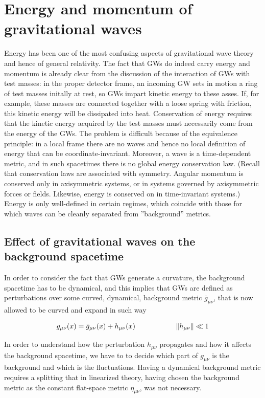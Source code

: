 \documentclass[binding=0.6cm, LaM]{sapthesis}
\begin{document}
\section{Energy and momentum of gravitational waves}
	Energy has been one of the most confusing aspects of gravitational wave theory and hence of general relativity.
	The fact that GWs do indeed carry energy and momentum is already clear from the discussion of the interaction of GWs with test masses:
	in the proper detector frame, an incoming GW sets in motion a ring of test masses initally at rest, 
	so GWs impart kinetic energy to these asses.
	If, for example, these masses are connected together with a loose spring with friction, 
	this kinetic energy will be dissipated into heat.
	Conservation of energy requires that the kinetic energy acquired by the test masses must necessarily come from the energy of the GWs.
	The problem is difficult because of the equivalence principle: in a local frame there are no waves and hence no local definition 
	of energy that can be coordinate-invariant.
	Moreover, a wave is a time-dependent metric, and in such spacetimes there is no global energy conservation law. 
	(Recall that conservation laws are associated with symmetry.
	Angular momentum is conserved only in axisymmetric systems, or in systems governed by axisymmetric forces or fields.
	Likewise, energy is conserved on in time-invariant systems.) 
	Energy is only well-defined in certain regimes, which coincide with those for which waves can be cleanly separated from ”background”
 	metrics.


\subsection{Effect of gravitational waves on the background spacetime}

	In order to consider the fact that GWs generate a curvature, the background spacetime has to be dynamical, 
	and this implies that GWs are defined as perturbations over some curved, dynamical, 
	background metric $\bar g_{\mu \nu}$, that is now allowed to be curved and expand in such way

		\begin{equation}
		g_{\mu \nu}(x) = \bar g_{\mu \nu}(x) + h_{\mu \nu}(x) \hspace*{2cm}\|h_{\mu\nu}\|\ll 1
		\end{equation}

	In order to understand how the perturbation $h_{\mu \nu}$ propagates and how it affects the background spacetime, 
	we have to to decide which part of $g_{\mu\nu}$ is the background and which is the fluctuations. 
	Having a dynamical background metric requires a splitting that in linearized theory, 
	having chosen the background metric as the constant flat-space metric $\eta_{\mu\nu}$, was not necessary.
\end{document}
